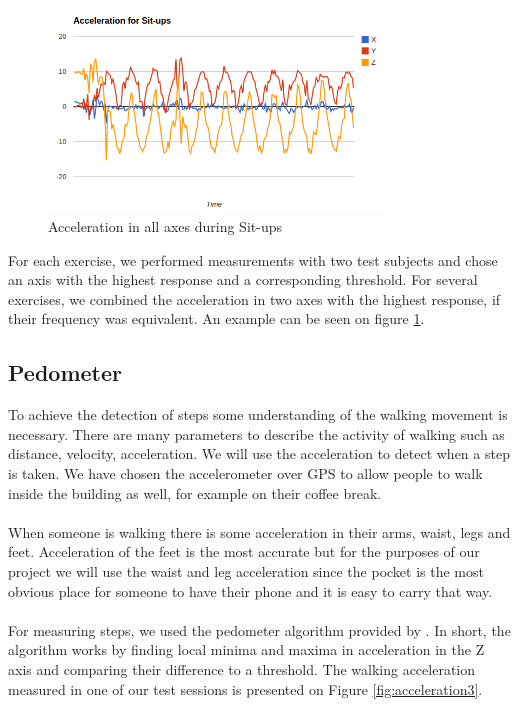 \begin{figure}[H]
	\centering
		\includegraphics[width=0.80\textwidth]{images/Chart3.png}
	\caption{Acceleration in all axes during Sit-ups}
	\label{fig:acceleration2}
\end{figure}

For each exercise, we performed measurements with two test subjects and chose an axis with the highest response and a corresponding threshold. For several exercises, we combined the acceleration in two axes with the highest response, if their frequency was equivalent. An example can be seen on figure \ref{fig:acceleration2}.


\subsection{Pedometer}

To achieve the detection of steps some understanding of the walking movement is necessary. There are many parameters to describe the activity of walking such as distance, velocity, acceleration. We will use the acceleration to detect when a step is taken. We have chosen the accelerometer over GPS to allow people to walk inside the building as well, for example on their coffee break.
\\\\
When someone is walking there is some acceleration in their arms, waist, legs and feet. Acceleration of the feet is the most accurate but for the purposes of our project we will use the waist and leg acceleration since the pocket is the most obvious place for someone to have their phone and it is easy to carry that way.
\\\\
For measuring steps, we used the pedometer algorithm provided by \cite{1_berk_2014}. In short, the algorithm works by finding local minima and maxima in acceleration in the Z axis and comparing their difference to a threshold. The walking acceleration measured in one of our test sessions is presented on Figure \ref{fig:acceleration3}.

